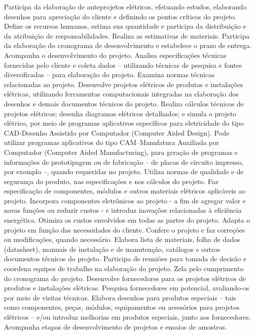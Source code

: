 \documentclass[
]{article}
\begin{document}
Participa da elaboração de anteprojetos elétricos, efetuando estudos,
elaborando desenhos para apreciação do cliente e definindo os pontos
críticos do projeto. Define os recursos humanos, estima sua quantidade e
participa da distribuição e da atribuição de responsabilidades. Realiza
as estimativas de materiais. Participa da elaboração do cronograma de
desenvolvimento e estabelece o prazo de entrega. Acompanha o
desenvolvimento do projeto. Analisa especificações técnicas fornecidas
pelo cliente e coleta dados -- utilizando técnicas de pesquisa e fontes
diversificadas -- para elaboração do projeto. Examina normas técnicas
relacionadas ao projeto. Desenvolve projetos elétricos de produtos e
instalações elétricas, utilizando ferramentas computacionais integradas
na elaboração dos desenhos e demais documentos técnicos do projeto.
Realiza cálculos técnicos de projetos elétricos; desenha diagramas
elétricos detalhados; e simula o projeto elétrico, por meio de programas
aplicativos específicos para eletricidade do tipo CAD-Desenho Assistido
por Computador (Computer Aided Design). Pode utilizar programas
aplicativos do tipo CAM--Manufatura Auxiliada por Computador (Computer
Aided Manufacturing), para geração de programas e informações de
prototipagem ou de fabricação -- de placas de circuito impresso, por
exemplo --, quando requeridas no projeto. Utiliza normas de qualidade e
de segurança do produto, nas especificações e nos cálculos do projeto.
Faz especificação de componentes, módulos e outros materiais elétricos
aplicáveis ao projeto. Incorpora componentes eletrônicos ao projeto - a
fim de agregar valor e novas funções ou reduzir custos - e introduz
inovações relacionadas à eficiência energética. Otimiza os custos
envolvidos em todas as partes do projeto. Adapta o projeto em função das
necessidades do cliente. Confere o projeto e faz correções ou
modificações, quando necessário. Elabora lista de materiais, folha de
dados (datasheet), manuais de instalação e de manutenção, catálogos e
outros documentos técnicos do projeto. Participa de reuniões para tomada
de decisão e coordena equipes de trabalho na elaboração do projeto. Zela
pelo cumprimento do cronograma do projeto. Desenvolve fornecedores para
os projetos elétricos de produtos e instalações elétricas. Pesquisa
fornecedores em potencial, avaliando-os por meio de visitas técnicas.
Elabora desenhos para produtos especiais -- tais como componentes,
peças, módulos, equipamentos ou acessórios para projetos elétricos --
e/ou introduz melhorias em produtos especiais, junto aos fornecedores.
Acompanha etapas de desenvolvimento de projetos e ensaios de amostras.
\end{document}
